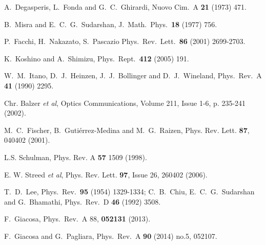 \documentclass[12pt]{article}%
\begin{document}
\begin{thebibliography}{99}
A.~Degasperis, L.~Fonda and G.~C.~Ghirardi,
Nuovo Cim.\ A \textbf{21} (1973) 471.


B.~Misra and E.~C.~G.~Sudarshan,
J.\ Math.\ Phys.\ \textbf{18} (1977) 756.

P.~Facchi, H.~Nakazato, S.~Pascazio
Phys.\ Rev.\ Lett.\ \textbf{86} (2001) 2699-2703.

K.~Koshino and A.~Shimizu,
Phys.\ Rept.\ \textbf{412} (2005) 191.


W.~M.~Itano, D.~J.~Heinzen, J.~J.~Bollinger and D.~J.~Wineland,
Phys.\ Rev.\ A \textbf{41} (1990) 2295.


Chr. Balzer \textit{et al}, Optics Communications, Volume
211, Issue 1-6, p. 235-241 (2002).

M.~C.~Fischer, B.~Guti{\'{e}}rrez-Medina and M.~G.~Raizen,
Phys. Rev. Lett. \textbf{87}, 040402 (2001).


L.S. Schulman, Phys. Rev. A \textbf{57} 1509 (1998).

E. W. Streed \textit{et al}, Phys. Rev. Lett. \textbf{97},
Issue 26, 260402 (2006).

T.~D.~Lee,
Phys.\ Rev.\ \textbf{95 } (1954) 1329-1334;
C.~B.~Chiu, E.~C.~G.~Sudarshan and G.~Bhamathi,
Phys.\ Rev.\ D \textbf{46} (1992) 3508.


F.~Giacosa,
Phys.\ Rev.\ A 88, \textbf{052131} (2013).


F.~Giacosa and G.~Pagliara,
Phys.\ Rev.\ A \textbf{90} (2014) no.5, 052107.



\end{thebibliography}
\end{document}
